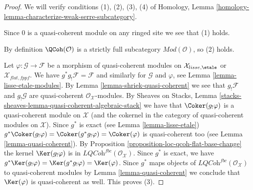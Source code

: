 \begin{proof}
We will verify conditions (1), (2), (3), (4) of
Homology, Lemma \ref{homology-lemma-characterize-weak-serre-subcategory}.

\medskip\noindent
Since $0$ is a quasi-coherent module on any ringed site we see that (1)
holds.

\medskip\noindent
By definition $\QCoh(\mathcal{O})$
is a strictly full subcategory $\textit{Mod}(\mathcal{O})$, so (2) holds.

\medskip\noindent
Let $\varphi : \mathcal{G} \to \mathcal{F}$ be a morphism of quasi-coherent
modules on $\mathcal{X}_{lisse,\etale}$ or $\mathcal{X}_{flat,fppf}$.
We have $g^*g_!\mathcal{F} = \mathcal{F}$ and similarly for
$\mathcal{G}$ and $\varphi$, see Lemma \ref{lemma-lisse-etale-modules}.
By Lemma \ref{lemma-shriek-quasi-coherent}
we see that $g_!\mathcal{F}$ and $g_!\mathcal{G}$ are quasi-coherent
$\mathcal{O}_\mathcal{X}$-modules. By Sheaves on Stacks, Lemma
\ref{stacks-sheaves-lemma-quasi-coherent-algebraic-stack}
we have that $\Coker(g_!\varphi)$ is a quasi-coherent
module on $\mathcal{X}$ (and the cokernel in the category
of quasi-coherent modules on $\mathcal{X}$).
Since $g^*$ is exact (see Lemma \ref{lemma-lisse-etale})
$g^*\Coker(g_!\varphi) = \Coker(g^*g_!\varphi) = \Coker(\varphi)$
is quasi-coherent too (see Lemma \ref{lemma-quasi-coherent}).
By Proposition \ref{proposition-loc-qcoh-flat-base-change}
the kernel $\Ker(g_!\varphi)$ is in
$\textit{LQCoh}^{fbc}(\mathcal{O}_\mathcal{X})$.
Since $g^*$ is exact, we have
$g^*\Ker(g_!\varphi) = \Ker(g^*g_!\varphi) = \Ker(\varphi)$.
Since $g^*$ maps objects of
$\textit{LQCoh}^{fbc}(\mathcal{O}_\mathcal{X})$ to quasi-coherent
modules by Lemma \ref{lemma-quasi-coherent} we conclude that
$\Ker(\varphi)$ is quasi-coherent as well. This proves (3).


\end{proof}
